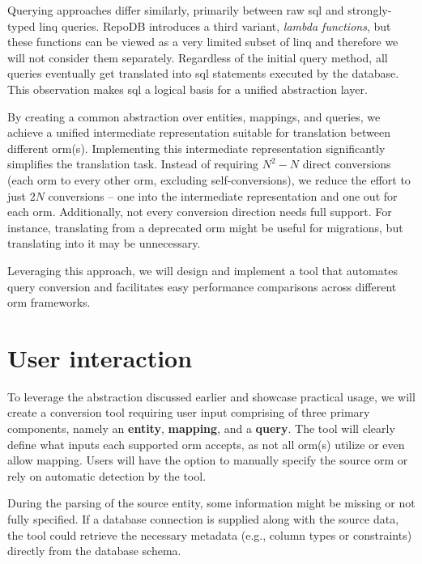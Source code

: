 Querying approaches differ similarly, primarily between raw \acrshort{sql} and strongly-typed \acrshort{linq} queries. RepoDB introduces a third variant, \textit{lambda functions}, but these functions can be viewed as a very limited subset of \acrshort{linq} and therefore we will not consider them separately. Regardless of the initial query method, all queries eventually get translated into \acrshort{sql} statements executed by the database. This observation makes \acrshort{sql} a logical basis for a unified abstraction layer.

By creating a common abstraction over entities, mappings, and queries, we achieve a unified intermediate representation suitable for translation between different \acrshort{orm}(s). Implementing this intermediate representation significantly simplifies the translation task. Instead of requiring $N^2 - N$ direct conversions (each \acrshort{orm} to every other \acrshort{orm}, excluding self-conversions), we reduce the effort to just $2N$ conversions -- one into the intermediate representation and one out for each \acrshort{orm}. Additionally, not every conversion direction needs full support. For instance, translating from a deprecated \acrshort{orm} might be useful for migrations, but translating into it may be unnecessary.

Leveraging this approach, we will design and implement a tool that automates query conversion and facilitates easy performance comparisons across different \acrshort{orm} frameworks.

\section{User interaction}
To leverage the abstraction discussed earlier and showcase practical usage, we will create a conversion tool requiring user input comprising of three primary components, namely an \textbf{entity}, \textbf{mapping}, and a \textbf{query}. The tool will clearly define what inputs each supported \acrshort{orm} accepts, as not all \acrshort{orm}(s) utilize or even allow mapping. Users will have the option to manually specify the source \acrshort{orm} or rely on automatic detection by the tool.

During the parsing of the source entity, some information might be missing or not fully specified. If a database connection is supplied along with the source data, the tool could retrieve the necessary metadata (e.g., column types or constraints) directly from the database schema.

